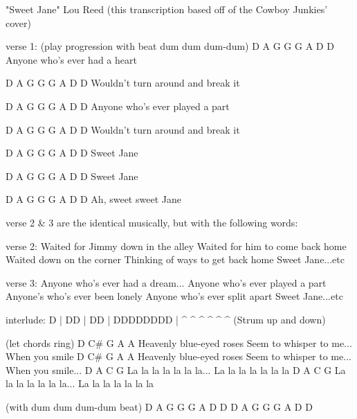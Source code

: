 "Sweet Jane"
Lou Reed
(this transcription based off of the Cowboy Junkies' cover)

verse 1:
(play progression with beat dum dum dum-dum)
D            A          G G         G          A         D D 
Anyone who's ever had a heart

D            A             G G         G          A         D D 
Wouldn't turn around and break it

D            A             G G         G          A         D D 
Anyone who's ever played a part

D            A          G G         G          A         D D 
Wouldn't turn around and break it

D            A          G G         G          A         D D 
Sweet        Jane

D            A          G G         G          A         D D 
Sweet        Jane

D            A          G G         G          A         D D 
Ah,          sweet sweet Jane

verse 2 & 3 are the identical musically, but with the following words:

verse 2:
Waited for Jimmy down in the alley
Waited for him to come back home
Waited down on the corner
Thinking of ways to get back home
Sweet Jane...etc

verse 3:
Anyone who's ever had a dream...
Anyone who's ever played a part
Anyone's who's ever been lonely
Anyone who's ever split apart
Sweet Jane...etc

interlude:
D |  DD  |   DD  |  DDDDDDDD |
^       ^      ^ ^ ^ ^
(Strum up and down)

(let chords ring)
D        C#              G                  A      A 
Heavenly blue-eyed roses Seem to whisper to me...  When you smile
D        C#              G                  A      A 
Heavenly blue-eyed roses Seem to whisper to me...  When you smile...
D           A            C           G 
La la la la la la la...  La la la la la la la
D           A            C           G 
La la la la la la la...  La la la la la la la

(with dum dum dum-dum beat)
D     A       G G      G         A      D D 
D     A       G G      G         A      D D 
